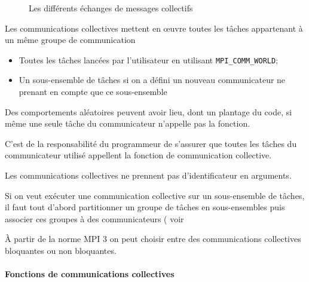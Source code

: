 \documentclass[11pt,a4paper]{article}
\begin{document}
\begin{figure}[ht]
\begin{center}
\end{center}
\caption{Les différents échanges de messages collectifs}
\end{figure}

Les communications collectives mettent en {\oe}uvre toutes les tâches
appartenant à un même groupe de communication
\begin{itemize}
\item Toutes les tâches lancées par l'utilisateur en utilisant
\texttt{MPI\_COMM\_WORLD};
\item Un sous-ensemble de tâches si on a défini un nouveau 
communicateur ne prenant en compte que ce sous-ensemble 
\end{itemize}

Des comportements aléatoires peuvent avoir lieu, dont un plantage du
code, si même une seule tâche du communicateur n'appelle pas la
fonction.

C'est de la responsabilité du programmeur de s'assurer que toutes les
tâches du communicateur utilisé appellent la fonction de communication
collective.


Les communications collectives ne prennent pas d'identificateur en arguments.

Si on veut exécuter une communication collective sur un sous-ensemble de tâches, il faut tout d'abord partitionner un groupe de tâches en sous-ensembles puis associer ces groupes à des communicateurs ( voir %

À partir de la norme MPI 3 on peut choisir entre des communications collectives bloquantes ou non bloquantes.

\paragraph{Fonctions de communications collectives}
\end{document}
